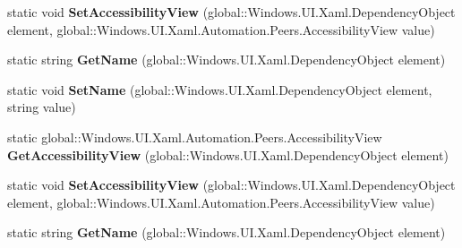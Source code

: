 \begin{DoxyCompactItemize}
static void {\bfseries Set\+Accessibility\+View} (global\+::\+Windows.\+U\+I.\+Xaml.\+Dependency\+Object element, global\+::\+Windows.\+U\+I.\+Xaml.\+Automation.\+Peers.\+Accessibility\+View value)
\item 
\mbox{\label{class_windows_1_1_u_i_1_1_xaml_1_1_automation_1_1_automation_properties_a467b1c94670b22d8bd778de6351a09b5}} 
static string {\bfseries Get\+Name} (global\+::\+Windows.\+U\+I.\+Xaml.\+Dependency\+Object element)
\item 
\mbox{\label{class_windows_1_1_u_i_1_1_xaml_1_1_automation_1_1_automation_properties_a4f2659d7e86be152ef660f9c7e6fd422}} 
static void {\bfseries Set\+Name} (global\+::\+Windows.\+U\+I.\+Xaml.\+Dependency\+Object element, string value)
\item 
\mbox{\label{class_windows_1_1_u_i_1_1_xaml_1_1_automation_1_1_automation_properties_a31d697be3f31155ecf22e524a584d4dc}} 
static global\+::\+Windows.\+U\+I.\+Xaml.\+Automation.\+Peers.\+Accessibility\+View {\bfseries Get\+Accessibility\+View} (global\+::\+Windows.\+U\+I.\+Xaml.\+Dependency\+Object element)
\item 
\mbox{\label{class_windows_1_1_u_i_1_1_xaml_1_1_automation_1_1_automation_properties_aac7e51cabcc5d52f7def17b31f53f18b}} 
static void {\bfseries Set\+Accessibility\+View} (global\+::\+Windows.\+U\+I.\+Xaml.\+Dependency\+Object element, global\+::\+Windows.\+U\+I.\+Xaml.\+Automation.\+Peers.\+Accessibility\+View value)
\item 
\mbox{\label{class_windows_1_1_u_i_1_1_xaml_1_1_automation_1_1_automation_properties_a467b1c94670b22d8bd778de6351a09b5}} 
static string {\bfseries Get\+Name} (global\+::\+Windows.\+U\+I.\+Xaml.\+Dependency\+Object element)
\item 
\mbox{\label{class_windows_1_1_u_i_1_1_xaml_1_1_automation_1_1_automation_properties_a4f2659d7e86be152ef660f9c7e6fd422}} 

\end{DoxyCompactItemize}
